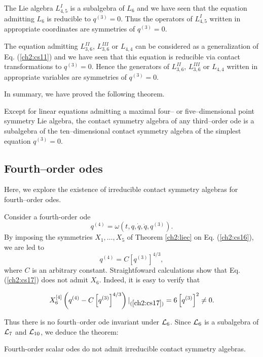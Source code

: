 The Lie algebra $L_{4,5}^I$
is a subalgebra of $L_6$ and we have seen that the equation admitting $L_6$ is
reducible to $q^{(3)}=0$. Thus  the operators of $L_{4,5}^I$ written
in appropriate coordinates  are symmetries of $q^{(3)}=0$.

The equation admitting $L_{3,6}^{II}$, $L_{3,6}^{III}$ or $L_{4,4}$  can be
considered as a generalization of Eq. (\ref{ch2:cs11}) and we have seen that this
equation is reducible via contact transformations to $q^{(3)}=0$. Hence  
the generators of $L_{3,6}^{II}$, $L_{3,6}^{III}$ or $L_{4,4}$ written in
appropriate variables are symmetries of $q^{(3)}=0$. 

In summary, we have proved the following theorem.
\begin{theo}
\label{ch2:3break}
\begin{em}
Except for linear equations admitting a maximal four-- or
five--dimensional point
symmetry Lie algebra, the contact symmetry algebra of any third--order ode is
a subalgebra of the ten--dimensional contact symmetry algebra of the simplest
equation $q^{(3)}=0$.
\end{em}
\end{theo}

\subsection{Fourth--order odes}
Here, we explore the existence of irreducible contact symmetry algebras
for fourth--order odes.

Consider a fourth-order ode
\begin{equation}
\label{ch2:cs16}
q^{(4)}=\omega (t,q,\dot q,\ddot q, q^{(3)}).
\end{equation}
By imposing the symmetries $X_1,\ldots , X_5$ of Theorem \ref{ch2:liec}
on Eq. (\ref{ch2:cs16}), we are led to
\begin{equation}
\label{ch2:cs17}
q^{(4)}=C \left [ q^{(3)} \right ]^{4/3},
\end{equation}
where $C$ is an arbitrary constant. Straightfoward calculations show that
Eq. (\ref{ch2:cs17}) does not admit $X_6$. Indeed, it is easy to verify that

\[X_6^{[4]}\left ( q^{(4)}-C \left [ q^{(3)} \right ]^{4/3}\right )
|_{(\ref{ch2:cs17})}=6\left [ q^{(3)}\right ]^2 \ne 0.\]

Thus there is no fourth--order ode
invariant under ${\cal L}_6$. Since ${\cal L}_6$ is a subalgebra of ${\cal L}_7$ and
${\cal L}_{10}$, we
deduce the theorem:
\begin{theo}
\label{ch2:4cont}
\begin{em}
Fourth-order scalar odes do not  admit irreducible contact symmetry
algebras.
\end{em}
\end{theo}
